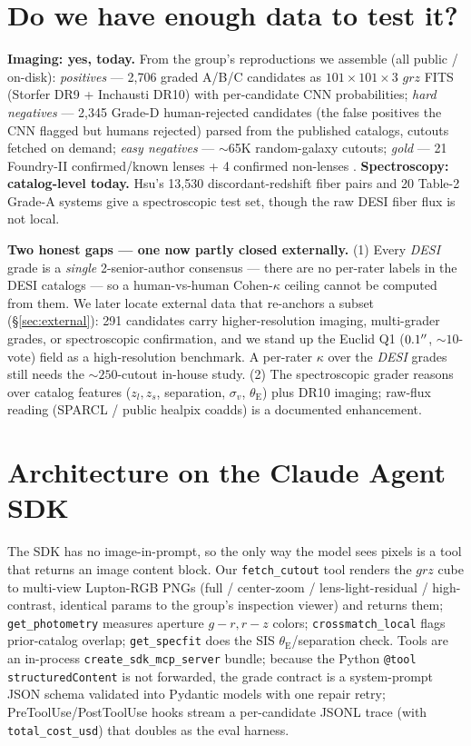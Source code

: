 \documentclass[11pt,letterpaper]{article}
\newcommand{\thetaE}{\ensuremath{\theta_{\mathrm{E}}}}
\newcommand{\sigmav}{\ensuremath{\sigma_v}}
\newcommand{\xmUnion}{291}           %
\begin{document}
\section{Do we have enough data to test it?}
\label{sec:data}
\textbf{Imaging: yes, today.} From the group's reproductions we assemble (all public /
on-disk): \emph{positives} --- 2{,}706 graded A/B/C candidates as $101\times101\times3$
$grz$ FITS (Storfer DR9 + Inchausti DR10) with per-candidate CNN probabilities;
\emph{hard negatives} --- 2{,}345 Grade-D human-rejected candidates (the false positives
the CNN flagged but humans rejected) parsed from the published catalogs, cutouts fetched
on demand; \emph{easy negatives} --- $\sim$65K random-galaxy cutouts; \emph{gold} ---
21 Foundry-II confirmed/known lenses + 4 confirmed non-lenses \citep{huang2025foundry2}.
\textbf{Spectroscopy: catalog-level today.} Hsu's 13{,}530 discordant-redshift fiber
pairs and 20 Table-2 Grade-A systems \citep{hsu2025pairwise} give a spectroscopic test
set, though the raw DESI fiber flux is not local.

\textbf{Two honest gaps --- one now partly closed externally.} (1) Every \emph{DESI} grade is a
\emph{single} 2-senior-author consensus --- there are no per-rater labels in the DESI catalogs ---
so a human-vs-human Cohen-$\kappa$ ceiling cannot be computed from them. We later locate external
data that re-anchors a subset (\S\ref{sec:external}): \xmUnion{} candidates carry higher-resolution
imaging, multi-grader grades, or spectroscopic confirmation, and we stand up the Euclid Q1
($0.1^{\prime\prime}$, ${\sim}10$-vote) field as a high-resolution benchmark. A per-rater $\kappa$ over the
\emph{DESI} grades still needs the ${\sim}250$-cutout in-house study. (2) The spectroscopic grader
reasons over catalog features ($z_l,z_s$, separation, \sigmav, \thetaE) plus DR10 imaging; raw-flux
reading (SPARCL / public healpix coadds) is a documented enhancement.

\section{Architecture on the Claude Agent SDK}
\label{sec:arch}
The SDK has no image-in-prompt, so the only way the model sees pixels is a tool that
returns an image content block. Our \texttt{fetch\_cutout} tool renders the $grz$ cube to
multi-view Lupton-RGB PNGs (full / center-zoom / lens-light-residual / high-contrast,
identical params to the group's inspection viewer) and returns them; \texttt{get\_photometry}
measures aperture $g\!-\!r,r\!-\!z$ colors; \texttt{crossmatch\_local} flags prior-catalog
overlap; \texttt{get\_specfit} does the SIS \thetaE/separation check. Tools are an
in-process \texttt{create\_sdk\_mcp\_server} bundle; because the Python \texttt{@tool}
\texttt{structuredContent} is not forwarded, the grade contract is a system-prompt JSON
schema validated into Pydantic models with one repair retry; PreToolUse/PostToolUse hooks
stream a per-candidate JSONL trace (with \texttt{total\_cost\_usd}) that doubles as the
eval harness.
\end{document}
